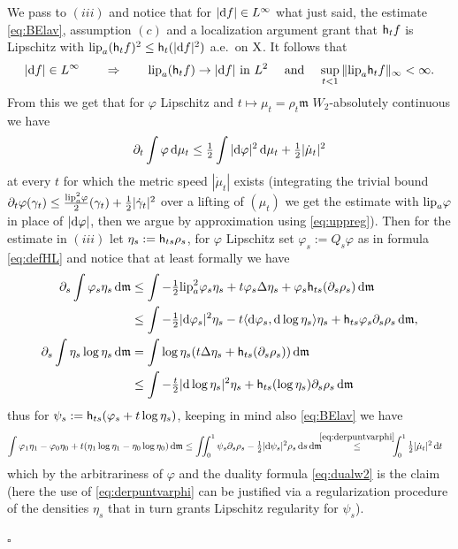 \documentclass[11pt]{article}
\numberwithin{equation}{section}
\newenvironment{idea}{\removelastskip\par\medskip   %
\noindent{\em Idea of the proof} \rm}{\penalty-20\null\hfill$\square$\par\medbreak}
\newcommand{\X}{{\rm X}}
\newcommand{\mm}{{\mathfrak m}}
\renewcommand{\d}{{\rm d}}
\newcommand{\lipa}{{\rm lip}_a}
\newcommand{\h}{{\sf h}} %
\newcommand\la{\langle}
\newcommand\ra{\rangle}
\begin{document}
\begin{idea}
We pass to $(iii)$ and  notice that   for $|\d f|\in L^\infty$ what just said, the estimate \eqref{eq:BElav}, assumption $(c)$ and a localization argument grant that  $\h_tf$ is Lipschitz with $\lipa(\h_tf)^2\leq\h_t(|\d f|^2)$ a.e.\ on $\X$. It follows that
\begin{equation}
\label{eq:uppreg}
|\d f|\in L^\infty\qquad\Rightarrow\qquad\text{$\lipa(\h_tf)\to|\d f|$ in $L^2\quad$ and $\quad\sup_{t<1}\|\lipa \h_tf\|_\infty<\infty$.}
\end{equation}
From this we get that for $\varphi$ Lipschitz  and $t\mapsto \mu_t=\rho_t\mm$ $W_2$-absolutely continuous we have
\begin{equation}
\label{eq:derpuntvarphi}
\partial_t\int\varphi\,\d\mu_t\leq\tfrac12\int|\d\varphi|^2\,\d\mu_t+\tfrac12|\dot\mu_t|^2
\end{equation}
 at every $t$ for which the metric speed $|\dot\mu_t|$ exists (integrating the trivial bound $\partial_t\varphi(\gamma_t)\leq\tfrac{\lipa^2\varphi}2(\gamma_t)+\tfrac12|\dot\gamma_t|^2$ over a lifting  of $(\mu_t)$ we get the estimate with $\lipa\varphi$ in place of $|\d\varphi|$, then we argue by approximation using \eqref{eq:uppreg}). Then for the estimate in $(iii)$  let $\eta_s:=\h_{ts}\rho_s$, for $\varphi$ Lipschitz set $\varphi_s:=Q_s\varphi$ as in formula \eqref{eq:defHL} and notice that at least formally we have
\[
\begin{split}
\partial_s\int\varphi_s\eta_s\,\d\mm&\leq\int-\tfrac12\lipa^2\varphi_s\eta_s+t\varphi_s\Delta\eta_s+\varphi_s\h_{ts}(\partial_s\rho_s)\,\d\mm\\
&\leq\int-\tfrac12|\d\varphi_s|^2\eta_s-t\la \d\varphi_s,\d \log\eta_s\ra \eta_s+\h_{ts}\varphi_s\partial_s\rho_s\,\d\mm,\\
\partial_s\int\eta_s\log\eta_s\,\d\mm&=\int\log\eta_s(t\Delta\eta_s+\h_{ts}(\partial_s\rho_s))\,\d\mm\\
&\leq\int-\tfrac t 2|\d\log\eta_s|^2\eta_s+\h_{ts}(\log\eta_s)\partial_s\rho_s\,\d\mm
\end{split}
\]
thus for $\psi_s:=\h_{ts}(\varphi_s+t\log\eta_s)$, keeping in mind also \eqref{eq:BElav} we have
\[
\begin{split}
\int\varphi_1\eta_1-\varphi_0\eta_0+t(\eta_1\log\eta_1-\eta_0\log\eta_0)\,\d\mm&\leq \iint_0^1 \psi_s\partial_s\rho_s-\tfrac12|\d\psi_s|^2\rho_s\,\d s\,\d\mm\!\!\!\stackrel{\eqref{eq:derpuntvarphi}}\leq\!\!\!\int_0^1\tfrac12|\dot\mu_t|^2\,\d t
\end{split}
\]
which by the arbitrariness of $\varphi$ and the duality formula \eqref{eq:dualw2} is the claim (here the use of \eqref{eq:derpuntvarphi} can be justified via a regularization procedure of the densities $\eta_s$ that in turn grants Lipschitz regularity for $\psi_s$).


\end{idea}
\end{document}
